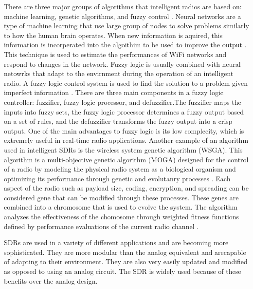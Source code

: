 There are three major groups of algorithms that intelligent radios are based on: machine learning, genetic algorithms, and fuzzy control \cite{amraoui2012intelligent}. Neural networks are a type of machine learning that use large group of nodes to solve problems similarly to how the human brain operates. When new information is aquired, this information is incorperated into the algoithim to be used to improve the output \cite{amini2011universal}. This technique is used to estimate the performances of WiFi networks and respond to changes in the network. Fuzzy logic is usually combined with neural netowrks that adapt to the envirnment during the operation of an intelligent radio. A fuzzy logic control system is used to find the solution to a problem given imperfect information \cite{amraoui2012intelligent}. There are three main components in a fuzzy logic controller: fuzzifier, fuzzy logic processor, and defuzzifier.The fuzzifier maps the inputs into fuzzy sets, the fuzzy logic processor determines a fuzzy output based on a set of rules, and the defuzzifier transforms the fuzzy output into a crisp output. One of the main advantages to fuzzy logic is its low complecity, which is extremely useful in real-time radio applications. Another example of an algorithm used in intelligent SDRs is the wireless system genetic algorithm (WSGA). This algorithm is a multi-objective genetic algorithm (MOGA) designed for the control of a radio by modeling the physical radio system as a biological organism and optimizing its performance through genetic and evolutanry processes \cite{rondeau2004cognitive}. Each aspect of the radio such as payload size, coding, encryption, and spreading can be considered gene that can be modified through these processes. These genes are combined into a chromosome that is used to evolve the system. The algorithm analyzes the effectiveness of the chomosome through weighted fitness functions defined by performance evaluations of the current radio channel \cite{rondeau2004cognitive}.\par
SDRs are used in a variety of different applications and are becoming more sophisticated. They are more modular than the analog equivalent and arecapable of adapting to their environment. They are also very easily updated and modified as opposed to using an analog circuit. The SDR is widely used because of these benefits over the analog design. \par
